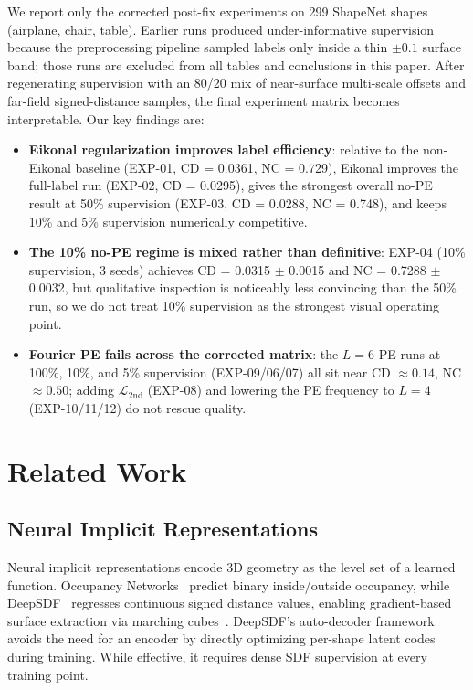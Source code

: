 \documentclass[conference]{IEEEtran}
\begin{document}
We report only the corrected post-fix experiments on 299 ShapeNet shapes (airplane, chair, table). Earlier runs produced under-informative supervision because the preprocessing pipeline sampled labels only inside a thin $\pm 0.1$ surface band; those runs are excluded from all tables and conclusions in this paper. After regenerating supervision with an 80/20 mix of near-surface multi-scale offsets and far-field signed-distance samples, the final experiment matrix becomes interpretable. Our key findings are:
\begin{itemize}
    \item \textbf{Eikonal regularization improves label efficiency}: relative to the non-Eikonal baseline (EXP-01, CD = 0.0361, NC = 0.729), Eikonal improves the full-label run (EXP-02, CD = 0.0295), gives the strongest overall no-PE result at 50\% supervision (EXP-03, CD = 0.0288, NC = 0.748), and keeps 10\% and 5\% supervision numerically competitive.
    \item \textbf{The 10\% no-PE regime is mixed rather than definitive}: EXP-04 (10\% supervision, 3 seeds) achieves CD = 0.0315 $\pm$ 0.0015 and NC = 0.7288 $\pm$ 0.0032, but qualitative inspection is noticeably less convincing than the 50\% run, so we do not treat 10\% supervision as the strongest visual operating point.
    \item \textbf{Fourier PE fails across the corrected matrix}: the $L=6$ PE runs at 100\%, 10\%, and 5\% supervision (EXP-09/06/07) all sit near CD $\approx 0.14$, NC $\approx 0.50$; adding $\mathcal{L}_{\text{2nd}}$ (EXP-08) and lowering the PE frequency to $L=4$ (EXP-10/11/12) do not rescue quality.
\end{itemize}

\section{Related Work}

\subsection{Neural Implicit Representations}

Neural implicit representations encode 3D geometry as the level set of a learned function. Occupancy Networks~\cite{occnet} predict binary inside/outside occupancy, while DeepSDF~\cite{deepsdf} regresses continuous signed distance values, enabling gradient-based surface extraction via marching cubes~\cite{marchingcubes}. DeepSDF's auto-decoder framework avoids the need for an encoder by directly optimizing per-shape latent codes during training. While effective, it requires dense SDF supervision at every training point.
\end{document}
